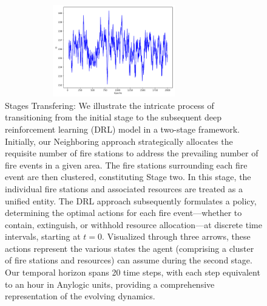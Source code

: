 \documentclass[lettersize,journal]{IEEEtran}
\begin{document}
      \begin{figure}[H]
        \centering
        \includegraphics[height=4cm,width=9.5cm]{figs/manager_G.png}
        \caption{Stages Transfering: We illustrate the intricate process of transitioning from the initial stage to the subsequent deep reinforcement learning (DRL) model in a two-stage framework. Initially, our Neighboring approach strategically allocates the requisite number of fire stations to address the prevailing number of fire events in a given area. The fire stations surrounding each fire event are then clustered, constituting Stage two. In this stage, the individual fire stations and associated resources are treated as a unified entity. The DRL approach subsequently formulates a policy, determining the optimal actions for each fire event—whether to contain, extinguish, or withhold resource allocation—at discrete time intervals, starting at $t=0$. Visualized through three arrows, these actions represent the various states the agent (comprising a cluster of fire stations and resources) can assume during the second stage. Our temporal horizon spans 20 time steps, with each step equivalent to an hour in Anylogic units, providing a comprehensive representation of the evolving dynamics.}\end{figure}
      
\end{document}
